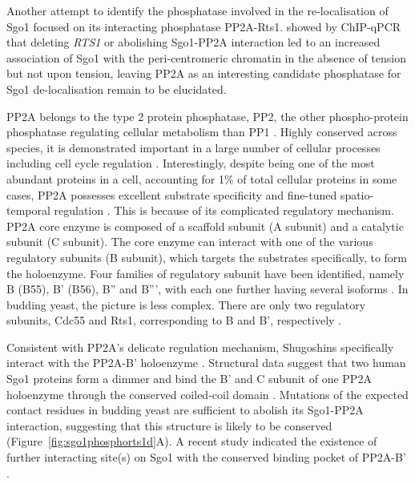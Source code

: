 Another attempt to identify the phosphatase involved in the re-localisation of Sgo1 focused on its interacting phosphatase PP2A-Rts1. \cite{Nerusheva2014} showed by ChIP-qPCR that deleting \textit{RTS1} or abolishing Sgo1-PP2A interaction led to an increased association of Sgo1 with the peri-centromeric chromatin in the absence of tension but not upon tension, leaving PP2A as an interesting candidate phosphatase for Sgo1 de-localisation remain to be elucidated. 

PP2A belongs to the type 2 protein phosphatase, PP2, the other phospho-protein phosphatase regulating cellular metabolism than PP1 \citep{Ingebritsen1983ProteinRegulation}. Highly conserved across species, it is demonstrated important in a large number of cellular processes including cell cycle regulation \citep{Janssens2001ProteinSignalling}. Interestingly, despite being one of the most abundant proteins in a cell, accounting for 1\% of total cellular proteins in some cases, PP2A possesses excellent substrate specificity and fine-tuned spatio-temporal regulation \citep{Shi2009Serine/threonineStructure}. This is because of its complicated regulatory mechanism. PP2A core enzyme is composed of a scaffold subunit (A subunit) and a catalytic subunit (C subunit). The core enzyme can interact with one of the various regulatory subunits (B subunit), which targets the substrates specifically, to form the holoenzyme. Four families of regulatory subunit have been identified, namely B (B55), B' (B56), B'' and B''', with each one further having several isoforms \citep{Shi2009Serine/threonineStructure}. In budding yeast, the picture is less complex. There are only two regulatory subunits, Cdc55 and Rts1, corresponding to B and B', respectively \citep{Zhao1997SaccharomycesFunctions}. 

Consistent with PP2A's delicate regulation mechanism, Shugoshins specifically interact with the PP2A-B' holoenzyme \citep{Kitajima2006a, Riedel2006, Tang2006a}. Structural data suggest that two human Sgo1 proteins form a dimmer and bind the B' and C subunit of one PP2A holoenzyme through the conserved coiled-coil domain \citep{Xu2009StructureInteraction}. Mutations of the expected contact residues in budding yeast are sufficient to abolish its Sgo1-PP2A interaction, suggesting that this structure is likely to be conserved (Figure~\ref{fig:sgo1phosphorts1d}A). A recent study indicated the existence of further interacting site(s) on Sgo1 with the conserved binding pocket of PP2A-B' \citep{Ueki2021AMitosis}. 


